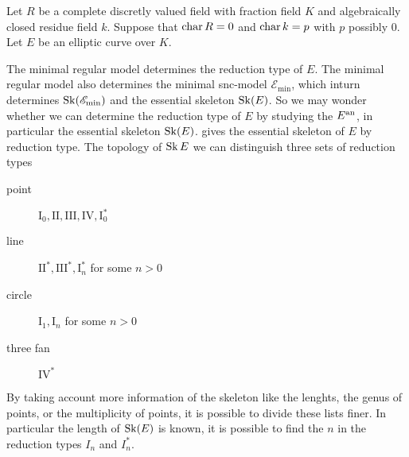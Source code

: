 Let $R$ be a complete discretly valued field with fraction field $K$ and algebraically closed residue field $k$. Suppose that  $\operatorname{char} R = 0$ and $\operatorname{char} k = p$ with $p$ possibly $0$. 
Let $E$ be an elliptic curve over $K$.

The minimal regular model determines the reduction type of $E$. 
The minimal regular model also determines the minimal snc-model $\mathscr E_\text{min} $, which inturn determines $\operatorname{Sk}(\mathscr E_\text{min} )$ and the essential skeleton $\operatorname{Sk}(E)$. 
So we may wonder whether we can determine the reduction type of $E$ by studying the $E{}^{\text{an}}$, in particular the essential skeleton $\operatorname{Sk}(E)$.
 gives the essential skeleton of $E$ by reduction type. 
The topology of $\operatorname{Sk} E$ we can distinguish three sets of reduction types 
\begin{description}
	\item[point] $\mathrm I_0, \mathrm{II}, \mathrm{III},\mathrm{IV}, \mathrm{I}_0^*$ 
	\item[line] $\mathrm{II}^*, \mathrm{III}^*, \mathrm{I}_n^*$ for some $n > 0$
	\item[circle]  $\mathrm{I}_1, \mathrm{I}_n$ for some  $n > 0$
	\item[three fan] $\mathrm {IV}^*$
\end{description}
By taking account more information of the skeleton like the lenghts, the genus of points, or the multiplicity of points, it is possible to divide these lists finer.
In particular the length of $\operatorname{Sk}(E)$ is known, it is possible to find the $n$ in the reduction types $I_n$ and $I_n^*$. 


